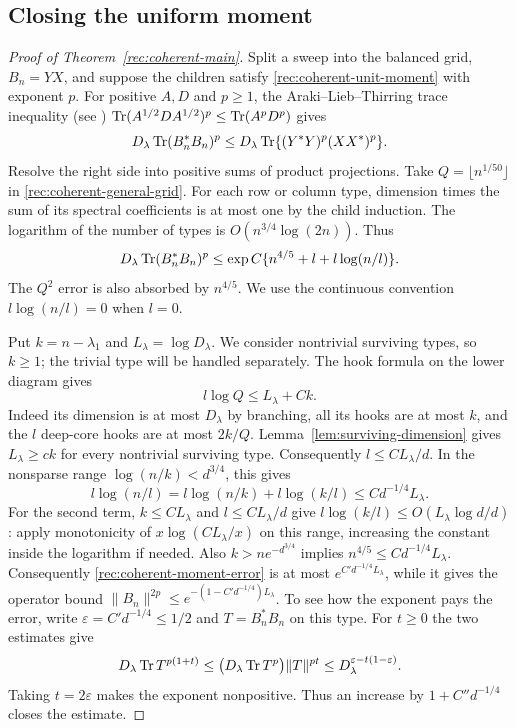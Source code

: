 \subsection{Closing the uniform moment}

\begin{proof}[Proof of Theorem~\ref{rec:coherent-main}]
Split a sweep into the balanced grid, $B_n=YX$, and suppose the
children satisfy \eqref{rec:coherent-unit-moment} with exponent $p$.
For positive $A,D$ and $p\ge1$, the Araki--Lieb--Thirring trace inequality \cite{araki1990} (see \cite[Theorem~1]{audenaert2007})
$\operatorname{Tr}(A^{1/2}DA^{1/2})^p\le\operatorname{Tr}(A^pD^p)$ gives
\begin{equation}\label{rec:coherent-trace-product}
 D_\lambda\operatorname{Tr}(B_n^*B_n)^p
 \le D_\lambda\operatorname{Tr}\{(Y^*Y)^p(XX^*)^p\}.
\end{equation}
Resolve the right side into positive sums of product projections.
Take $Q=\lfloor n^{1/50}\rfloor$ in
\eqref{rec:coherent-general-grid}.  For each row or column type,
dimension times the sum of its spectral coefficients is at most
one by the child induction.  The logarithm of the number of types
is $O(n^{3/4}\log(2n))$.  Thus
\begin{equation}\label{rec:coherent-moment-error}
 D_\lambda\operatorname{Tr}(B_n^*B_n)^p
 \le\exp C\{n^{4/5}+l+l\log(n/l)\}.
\end{equation}
The $Q^2$ error is also absorbed by $n^{4/5}$.  We use the
continuous convention $l\log(n/l)=0$ when $l=0$.

Put $k=n-\lambda_1$ and $L_\lambda=\log D_\lambda$. We consider nontrivial surviving types, so $k\ge1$; the trivial type will be handled separately.  The hook formula on the lower
diagram gives
\begin{equation}\label{rec:coherent-core-dimension}
 l\log Q\le L_\lambda+Ck.
\end{equation}
Indeed its dimension is at most $D_\lambda$ by branching, all its
hooks are at most $k$, and the $l$ deep-core hooks are at most $2k/Q$.
Lemma~\ref{lem:surviving-dimension} gives $L_\lambda\ge ck$
for every nontrivial surviving type.
Consequently $l\le CL_\lambda/d$.
In the nonsparse range $\log(n/k)<d^{3/4}$, this gives
\begin{equation}\label{rec:coherent-small-error}
 l\log(n/l)
 =l\log(n/k)+l\log(k/l)\le Cd^{-1/4}L_\lambda.
\end{equation}
For the second term, $k\le CL_\lambda$ and
$l\le CL_\lambda/d$ give
$l\log(k/l)\le O(L_\lambda\log d/d)$: apply monotonicity of
$x\log(CL_\lambda/x)$ on this range, increasing the constant
inside the logarithm if needed.  Also $k>ne^{-d^{3/4}}$ implies
$n^{4/5}\le Cd^{-1/4}L_\lambda$.
Consequently \eqref{rec:coherent-moment-error} is at most
$e^{C'd^{-1/4}L_\lambda}$, while it gives the operator bound
$\|B_n\|^{2p}\le e^{-(1-C'd^{-1/4})L_\lambda}$.
To see how the exponent pays the error, write
$\varepsilon=C'd^{-1/4}\le1/2$ and $T=B_n^*B_n$ on this type.
For $t\ge0$ the two estimates give
\[
 D_\lambda\operatorname{Tr} T^{p(1+t)}
 \le \bigl(D_\lambda\operatorname{Tr} T^p\bigr)\|T\|^{pt}
 \le D_\lambda^{\varepsilon-t(1-\varepsilon)}.
\]
Taking $t=2\varepsilon$ makes the exponent nonpositive.  Thus an
increase by $1+C''d^{-1/4}$ closes the estimate.


\end{proof}

